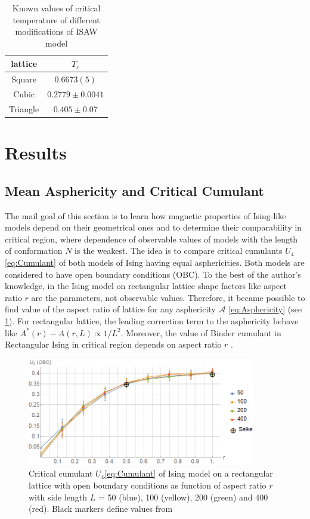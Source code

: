 \documentclass[a4paper]{jpconf}
\begin{document}
\begin{table}[h]
    \centering
    \begin{tabular}{|c|c|}
        \hline
        lattice & $T_{c}$ \\ \hline
        Square & $0.6673(5)$ \cite{Caracciolo2011} \\ \hline
        Cubic & $0.2779 \pm 0.0041$\cite{Tesi1996} \\ \hline
        Triangle & $ 0.405 \pm 0.07$\cite{Privman1986} \\ \hline
    \end{tabular}
    \caption{Known values of critical temperature of different modifications of ISAW model}
    \label{tab:ISAW_T_c}
\end{table}

\section{Results}

\subsection{Mean Asphericity and Critical Cumulant}

The mail goal of this section is to learn how magnetic properties of Ising-like models depend on their geometrical ones and to determine their comparability in critical region, where dependence of observable values of models with the length of conformation $N$ is the weakest. The idea is to compare critical cumulants $U_{4}$ \eqref{eq:Cumulant} of both models of Ising having equal asphericities. Both models are considered to have open boundary conditions (OBC). To the best of the author’s knowledge, in the Ising model on rectangular lattice shape factors like aspect ratio $r$ are the parameters, not observable values. Therefore, it became possible to find value of the aspect ratio of lattice for any asphericity $\mathcal{A}$ \eqref{eq:Asphericity} (see \cref{fig:A_r}). For rectangular lattice, the leading correction term to the asphericity behave like $A^{*}(r) - A(r, L) \propto 1 / L^{2}$. Moreover, the value of Binder cumulant in Rectangular Ising in critical region depends on aspect ratio $r$ \cite{Selke2006}.

\begin{figure}[h]
    \centering
    \includegraphics[width=100mm]{Images/CumulantOBC.png}
    \caption{Critical cumulant $U_{4}$\eqref{eq:Cumulant} of Ising model on a rectangular lattice with open boundary conditions as function of aspect ratio $r$ with side length $L$ = 50 (blue), 100 (yellow), 200 (green) and 400 (red). Black markers define values from \cite{Selke2006}}
    \label{fig:A_r}
\end{figure}
\end{document}

